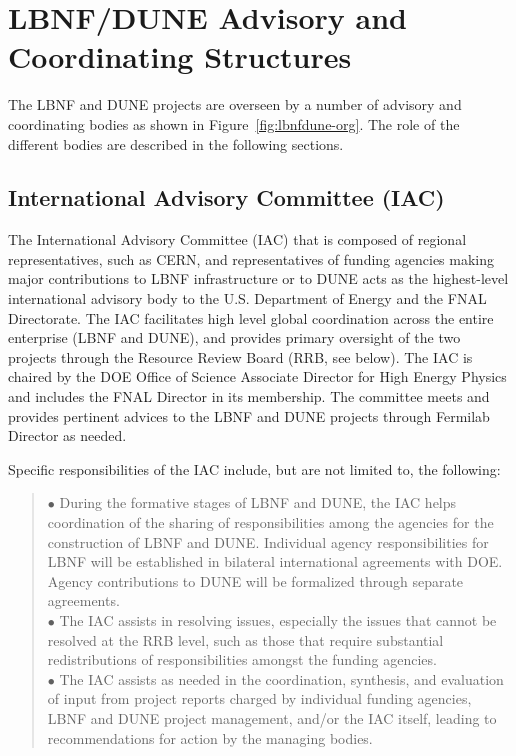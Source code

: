 \section{LBNF/DUNE Advisory and Coordinating Structures}
\label{sec:lbnf-dune-interface}

The LBNF and DUNE projects are overseen by a number of advisory and
coordinating bodies as shown in Figure~\ref{fig:lbnfdune-org}.
The role of the different bodies are described in the following sections.  

\subsection{International Advisory Committee (IAC) }

The International Advisory Committee (IAC) that is composed of
regional representatives, such as CERN, and representatives of
funding agencies making major contributions to LBNF infrastructure or to DUNE
acts as the highest-level international advisory body to the U.S.
Department of Energy and the FNAL Directorate. The IAC facilitates
high level global coordination across the entire enterprise (LBNF and DUNE),
and provides primary oversight of the two projects through
the Resource Review Board (RRB, see below). 
The IAC is chaired by the DOE Office of Science Associate Director
for High Energy Physics and includes the FNAL Director in its membership.  
The committee meets and provides pertinent advices to the LBNF and DUNE
projects through Fermilab Director as needed.  

Specific responsibilities of the IAC include, but are not limited to,
the following:


\begin{quote}
$\bullet$ During the formative stages of LBNF and DUNE,
the IAC helps coordination of the sharing of responsibilities among
the agencies for the construction of LBNF and DUNE.
Individual agency responsibilities for LBNF will be established in
bilateral international agreements with DOE. Agency contributions to
DUNE will be formalized through separate agreements.\\
$\bullet$ The IAC assists in resolving issues, especially the
issues that cannot be resolved at the RRB level, such as those that
require substantial redistributions of responsibilities amongst the
funding agencies.\\
$\bullet$ The IAC assists as needed in the coordination,
synthesis, and evaluation of input from project reports charged by
individual funding agencies, LBNF and DUNE project management,
and/or the IAC itself, leading to recommendations for action by
the managing bodies.
\end{quote}

